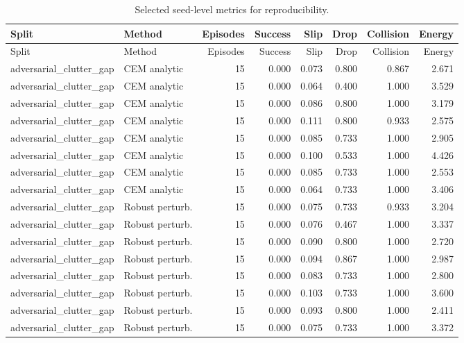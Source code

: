 {\scriptsize
\setlength{\tabcolsep}{2.5pt}
\begin{longtable}{llrrrrrr}
\caption{Selected seed-level metrics for reproducibility.}\label{tab:seed-metrics}\\
\toprule
Split & Method & Episodes & Success & Slip & Drop & Collision & Energy \\
\midrule
\endfirsthead
\toprule
Split & Method & Episodes & Success & Slip & Drop & Collision & Energy \\
\midrule
\endhead
adversarial\_clutter\_gap & CEM analytic & 15 & 0.000 & 0.073 & 0.800 & 0.867 & 2.671 \\
adversarial\_clutter\_gap & CEM analytic & 15 & 0.000 & 0.064 & 0.400 & 1.000 & 3.529 \\
adversarial\_clutter\_gap & CEM analytic & 15 & 0.000 & 0.086 & 0.800 & 1.000 & 3.179 \\
adversarial\_clutter\_gap & CEM analytic & 15 & 0.000 & 0.111 & 0.800 & 0.933 & 2.575 \\
adversarial\_clutter\_gap & CEM analytic & 15 & 0.000 & 0.085 & 0.733 & 1.000 & 2.905 \\
adversarial\_clutter\_gap & CEM analytic & 15 & 0.000 & 0.100 & 0.533 & 1.000 & 4.426 \\
adversarial\_clutter\_gap & CEM analytic & 15 & 0.000 & 0.085 & 0.733 & 1.000 & 2.553 \\
adversarial\_clutter\_gap & CEM analytic & 15 & 0.000 & 0.064 & 0.733 & 1.000 & 3.406 \\
adversarial\_clutter\_gap & Robust perturb. & 15 & 0.000 & 0.075 & 0.733 & 0.933 & 3.204 \\
adversarial\_clutter\_gap & Robust perturb. & 15 & 0.000 & 0.076 & 0.467 & 1.000 & 3.337 \\
adversarial\_clutter\_gap & Robust perturb. & 15 & 0.000 & 0.090 & 0.800 & 1.000 & 2.720 \\
adversarial\_clutter\_gap & Robust perturb. & 15 & 0.000 & 0.094 & 0.867 & 1.000 & 2.987 \\
adversarial\_clutter\_gap & Robust perturb. & 15 & 0.000 & 0.083 & 0.733 & 1.000 & 2.800 \\
adversarial\_clutter\_gap & Robust perturb. & 15 & 0.000 & 0.103 & 0.733 & 1.000 & 3.600 \\
adversarial\_clutter\_gap & Robust perturb. & 15 & 0.000 & 0.093 & 0.800 & 1.000 & 2.411 \\
adversarial\_clutter\_gap & Robust perturb. & 15 & 0.000 & 0.075 & 0.733 & 1.000 & 3.372 \\

\end{longtable}}
